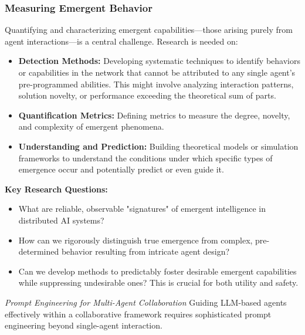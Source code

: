 \documentclass[12pt]{amsart}
\begin{document}
\subsubsection{Measuring Emergent Behavior}
\label{subsubsec:measuring_emergence}
Quantifying and characterizing emergent capabilities—those arising purely from agent interactions—is a central challenge. Research is needed on:
\begin{itemize}[leftmargin=*]
    \item \textbf{Detection Methods:} Developing systematic techniques to identify behaviors or capabilities in the network that cannot be attributed to any single agent's pre-programmed abilities. This might involve analyzing interaction patterns, solution novelty, or performance exceeding the theoretical sum of parts.
    \item \textbf{Quantification Metrics:} Defining metrics to measure the degree, novelty, and complexity of emergent phenomena.
    \item \textbf{Understanding and Prediction:} Building theoretical models or simulation frameworks to understand the conditions under which specific types of emergence occur and potentially predict or even guide it.
\end{itemize}
\textbf{Key Research Questions:}
\begin{itemize}[leftmargin=*, label={--}]
    \item What are reliable, observable "signatures" of emergent intelligence in distributed AI systems?
    \item How can we rigorously distinguish true emergence from complex, pre-determined behavior resulting from intricate agent design?
    \item Can we develop methods to predictably foster desirable emergent capabilities while suppressing undesirable ones? This is crucial for both utility and safety.
\end{itemize}

 \textit{Prompt Engineering for Multi-Agent Collaboration} 
\label{subsec:prompt_engineering_challenges}
Guiding LLM-based agents effectively within a collaborative framework requires sophisticated prompt engineering beyond single-agent interaction.
\end{document}
